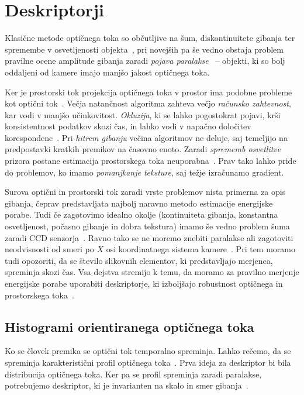 \section{Deskriptorji}
Klasične metode optičnega toka so občutljive na šum, diskontinuitete gibanja ter spremembe v osvetljenosti objekta~\cite{brox2011large}, pri novejših pa še vedno obstaja problem pravilne ocene amplitude gibanja zaradi \emph{pojava paralakse}~\cite{xu2012scale} -- objekti, ki so bolj oddaljeni od kamere imajo manjšo jakost optičnega toka. 


Ker je prostorski tok projekcija optičnega toka v prostor ima podobne probleme kot optični tok~\cite{yan2016scene}. Večja natančnost algoritma zahteva večjo \emph{računsko zahtevnost}, kar vodi v manjšo učinkovitost. \emph{Okluzija}, ki se lahko pogostokrat pojavi, krši konsistentnost podatkov skozi čas, in lahko vodi v napačno določitev korespondenc~\cite{yan2016scene}. Pri \emph{hitrem gibanju} večina algoritmov ne deluje, saj temeljijo na predpostavki kratkih premikov na časovno enoto. Zaradi \emph{sprememb osvetlitve} prizora postane estimacija prostorskega toka neuporabna~\cite{yan2016scene}. Prav tako lahko pride do problemov, ko imamo \emph{pomanjkanje teksture}, saj težje izračunamo gradient.

Surova optični in prostorski tok zaradi vrste problemov nista primerna za opis gibanja, čeprav predstavljata najbolj naravno metodo estimacije energijske porabe. Tudi če zagotovimo idealno okolje (kontinuiteta gibanja, konstantna osvetljenost, počasno gibanje in dobra tekstura) imamo še vedno problem šuma zaradi CCD senzorja~\cite{wedel2011stereo}. Ravno tako se ne moremo znebiti paralakse ali zagotoviti neodvisnosti od smeri po $X$ osi koordinatnega sistema kamere~\cite{chaudhry2009histograms}. Pri tem moramo tudi opozoriti, da se število slikovnih elementov, ki predstavljajo merjenca, spreminja skozi čas. Vsa dejstva stremijo k temu, da moramo za pravilno merjenje energijske porabe uporabiti deskriptorje, ki izboljšajo robustnost optičnega in prostorskega toka~\cite{chaudhry2009histograms}. 







\subsection{Histogrami orientiranega optičnega toka}\label{sec:hoof}
Ko se človek premika se optični tok temporalno spreminja. Lahko rečemo, da se spreminja karakteristični profil optičnega toka~\cite{chaudhry2009histograms}. Prva ideja za deskriptor bi bila distribucija optičnega toka. Ker pa se profil spreminja zaradi paralakse, potrebujemo deskriptor, ki je invarianten na skalo in smer gibanja~\cite{chaudhry2009histograms}.


